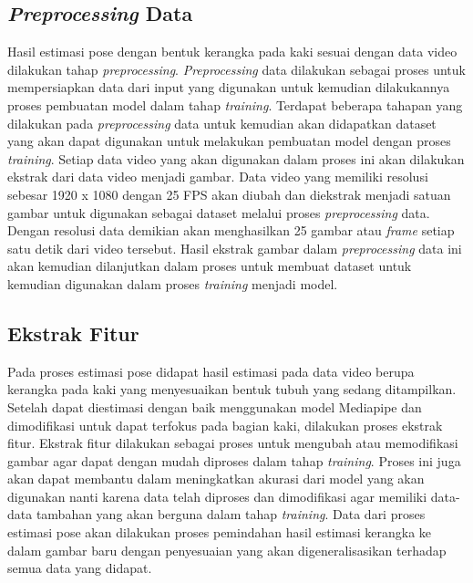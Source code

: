 \subsection{\emph{Preprocessing} Data}
\label{subsec:PreProcessingData}

Hasil estimasi pose dengan bentuk kerangka pada kaki sesuai dengan data video dilakukan tahap \emph{preprocessing}. \emph{Preprocessing} data dilakukan sebagai proses untuk mempersiapkan data dari input yang digunakan untuk kemudian dilakukannya proses pembuatan model dalam tahap \emph{training}. Terdapat beberapa tahapan yang dilakukan pada \emph{preprocessing} data untuk kemudian akan didapatkan dataset yang akan dapat digunakan untuk melakukan pembuatan model dengan proses \emph{training}. Setiap data video yang akan digunakan dalam proses ini akan dilakukan ekstrak dari data video menjadi gambar. Data video yang memiliki resolusi sebesar 1920 x 1080 dengan 25 FPS akan diubah dan diekstrak menjadi satuan gambar untuk digunakan sebagai dataset melalui proses \emph{preprocessing} data. Dengan resolusi data demikian akan menghasilkan 25 gambar atau \emph{frame} setiap satu detik dari video tersebut. Hasil ekstrak gambar dalam \emph{preprocessing} data ini akan kemudian dilanjutkan dalam proses untuk membuat dataset untuk kemudian digunakan dalam proses \emph{training} menjadi model.

\subsection{Ekstrak Fitur}
\label{subsec:AugmentasiData}

Pada proses estimasi pose didapat hasil estimasi pada data video berupa kerangka pada kaki yang menyesuaikan bentuk tubuh yang sedang ditampilkan. Setelah dapat diestimasi dengan baik menggunakan model Mediapipe dan dimodifikasi untuk dapat terfokus pada bagian kaki, dilakukan proses ekstrak fitur. Ekstrak fitur dilakukan sebagai proses untuk mengubah atau memodifikasi gambar agar dapat dengan mudah diproses dalam tahap \emph{training}. Proses ini juga akan dapat membantu dalam meningkatkan akurasi dari model yang akan digunakan nanti karena data telah diproses dan dimodifikasi agar memiliki data-data tambahan yang akan berguna dalam tahap \emph{training}. Data dari proses estimasi pose akan dilakukan proses pemindahan hasil estimasi kerangka ke dalam gambar baru dengan penyesuaian yang akan digeneralisasikan terhadap semua data yang didapat. 

